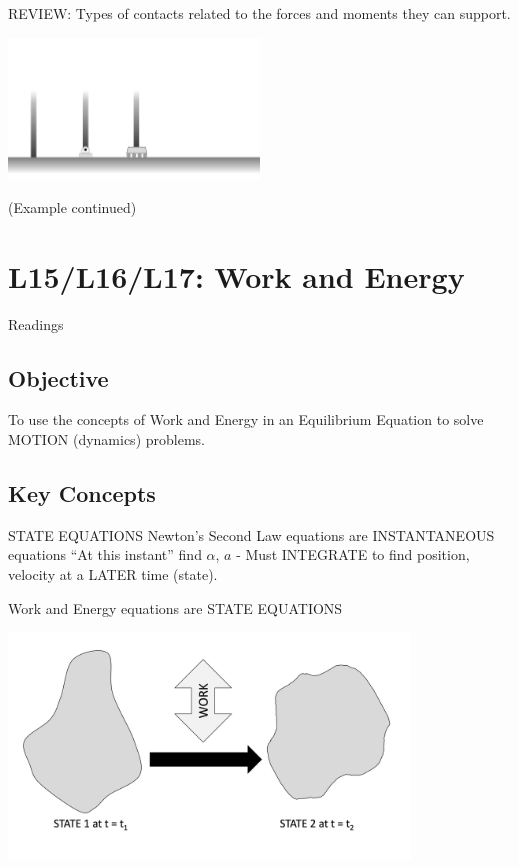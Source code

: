 \documentclass[12pt,letterpaper,twoside]{report}
\begin{document}
\vspace*{32\baselineskip}

REVIEW: Types of contacts related to the forces and moments they can support. 

 \includegraphics[trim={1cm 1cm 14cm 7cm},clip,width=0.5\textwidth, left]{Slide61} 

\newpage

(Example continued)

\chapter{L15/L16/L17: Work and Energy}
Readings
\section{Objective}
To use the concepts of Work and Energy in an Equilibrium Equation to solve MOTION (dynamics) problems.

\section{Key Concepts}
STATE EQUATIONS
Newton’s Second Law equations are INSTANTANEOUS equations
“At this instant” find $\alpha$, $a$  - Must INTEGRATE to find position, velocity at a LATER time (state).


\vspace*{8\baselineskip}

Work and Energy equations are STATE EQUATIONS

 \includegraphics[trim={0cm 2cm 0cm 1cm},clip,width=0.8\textwidth, center]{Slide63}
\end{document}
